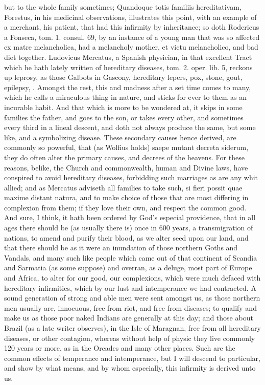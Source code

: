 {{but to the whole family sometimes; Quandoque totis familiis
hereditativam, Forestus, in his medicinal observations,
illustrates this point, with an example of a merchant, his patient,
that had this infirmity by inheritance; so doth Rodericus a Fonseca,
tom. 1. consul. 69, by an instance of a young man that was so affected
ex matre melancholica, had a melancholy mother, et victu melancholico,
and bad diet together. Ludovicus Mercatus, a Spanish physician, in that
excellent Tract which he hath lately written of hereditary diseases,
tom. 2. oper. lib. 5, reckons up leprosy, as those Galbots in
Gascony, hereditary lepers, pox, stone, gout, epilepsy, \etc{}. Amongst the
rest, this and madness after a set time comes to many, which he calls a
miraculous thing in nature, and sticks for ever to them as an incurable
habit. And that which is more to be wondered at, it skips in some
families the father, and goes to the son, or takes every other,
and sometimes every third in a lineal descent, and doth not always
produce the same, but some like, and a symbolizing disease. These
secondary causes hence derived, are commonly so powerful, that (as
Wolfius holds) saepe mutant decreta siderum, they do often alter
the primary causes, and decrees of the heavens. For these reasons,
belike, the Church and commonwealth, human and Divine laws, have
conspired to avoid hereditary diseases, forbidding such marriages as
are any whit allied; and as Mercatus adviseth all families to take
such, si fieri possit quae maxime distant natura, and to make choice of
those that are most differing in complexion from them; if they love
their own, and respect the common good. And sure, I think, it hath been
ordered by God's especial providence, that in all ages there should be
(as usually there is) once in 600 years, a transmigration of
nations, to amend and purify their blood, as we alter seed upon our
land, and that there should be as it were an inundation of those
northern Goths and Vandals, and many such like people which came out of
that continent of Scandia and Sarmatia (as some suppose) and overran,
as a deluge, most part of Europe and Africa, to alter for our good, our
complexions, which were much defaced with hereditary infirmities, which
by our lust and intemperance we had contracted. A sound generation of
strong and able men were sent amongst us, as those northern men usually
are, innocuous, free from riot, and free from diseases; to qualify and
make us as those poor naked Indians are generally at this day; and
those about Brazil (as a late writer observes), in the Isle of
Maragnan, free from all hereditary diseases, or other contagion,
whereas without help of physic they live commonly 120 years or more, as
in the Orcades and many other places. Such are the common effects of
temperance and intemperance, but I will descend to particular, and show
by what means, and by whom especially, this infirmity is derived unto
us.

}}
